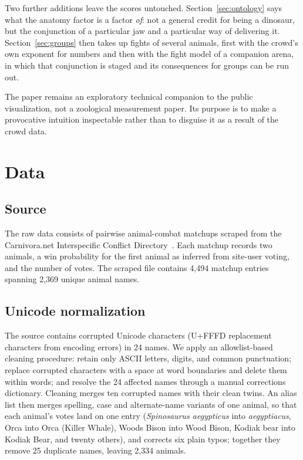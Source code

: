 \documentclass[11pt]{article}
\begin{document}
Two further additions leave the scores untouched. Section~\ref{sec:ontology} says what the anatomy factor is a factor \emph{of}: not a general credit for being a dinosaur, but the conjunction of a particular jaw and a particular way of delivering it. Section~\ref{sec:groups} then takes up fights of several animals, first with the crowd's own exponent for numbers and then with the fight model of a companion arena, in which that conjunction is staged and its consequences for groups can be run out.

The paper remains an exploratory technical companion to the public visualization, not a zoological measurement paper. Its purpose is to make a provocative intuition inspectable rather than to disguise it as a result of the crowd data.


\section{Data}
\label{sec:data}

\subsection{Source}
The raw data consists of pairwise animal-combat matchups scraped from the Carnivora.net Interspecific Conflict Directory~\cite{carnivora}. Each matchup records two animals, a win probability for the first animal as inferred from site-user voting, and the number of votes. The scraped file contains 4,494 matchup entries spanning 2,369 unique animal names.

\subsection{Unicode normalization}
The source contains corrupted Unicode characters (U+FFFD replacement characters from encoding errors) in 24 names. We apply an allowlist-based cleaning procedure: retain only ASCII letters, digits, and common punctuation; replace corrupted characters with a space at word boundaries and delete them within words; and resolve the 24 affected names through a manual corrections dictionary. Cleaning merges ten corrupted names with their clean twins. An alias list then merges spelling, case and alternate-name variants of one animal, so that each animal's votes land on one entry (\textit{Spinosaurus aegypticus} into \textit{aegyptiacus}, Orca into Orca (Killer Whale), Woods Bison into Wood Bison, Kodiak bear into Kodiak Bear, and twenty others), and corrects six plain typos; together they remove 25 duplicate names, leaving 2,334 animals.
\end{document}
